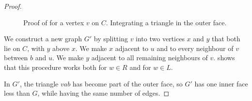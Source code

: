 \documentclass{patmorin}
\begin{document}
\begin{proof}
  \begin{figure}
     \caption{Proof of  for a vertex
       $v$ on $C$. Integrating a triangle in the outer face.}
   \end{figure}


 We construct a new graph $G'$ by splitting $v$ into two vertices $x$
 and $y$ that both lie on $C$, with $y$ above $x$.
 We make $x$ adjacent to $u$ and to every neighbour of
 $v$ between $b$ and $u$.
 We make
 $y$ adjacent to all remaining neighbours of $v$.
 shows that this procedure works both for $w\in R$
and for $w\in L$.
 
   In $G'$, the triangle $vab$ has become part of the outer face, so $G'$ has one inner
   face less than $G$, while having the same number of edges.
   

\end{proof}
\end{document}
